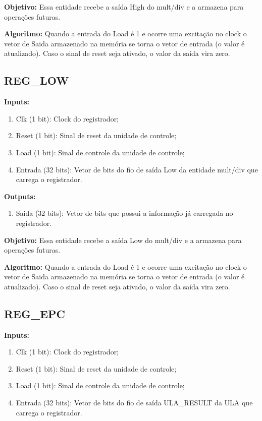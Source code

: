 \textbf{Objetivo:} Essa entidade recebe a saída High do mult/div e a armazena para operações futuras.

\textbf{Algoritmo:} Quando a entrada do Load é 1 e ocorre uma excitação no clock o vetor de Saida armazenado na memória se torna o vetor de entrada (o valor é atualizado). Caso o sinal de reset seja ativado, o valor da saída vira zero.



\subsection{REG\_LOW}

\textbf{Inputs:}

\begin{enumerate}
    \item Clk (1 bit): Clock do registrador;
    \item Reset (1 bit): Sinal de reset da unidade de controle;
    \item Load (1 bit): Sinal de controle da unidade de controle;
    \item Entrada (32 bits): Vetor de bits do fio de saída Low da entidade mult/div que carrega o registrador.
    
\end{enumerate}

\textbf{Outputs:}

\begin{enumerate}
    \item Saida (32 bits): Vetor de bits que possui a informação já carregada no registrador.
\end{enumerate}

\textbf{Objetivo:} Essa entidade recebe a saída Low do mult/div e a armazena para operações futuras.

\textbf{Algoritmo:} Quando a entrada do Load é 1 e ocorre uma excitação no clock o vetor de Saida armazenado na memória se torna o vetor de entrada (o valor é atualizado). Caso o sinal de reset seja ativado, o valor da saída vira zero.

\newpage

\subsection{REG\_EPC}

\textbf{Inputs:}

\begin{enumerate}
    \item Clk (1 bit): Clock do registrador;
    \item Reset (1 bit): Sinal de reset da unidade de controle;
    \item Load (1 bit): Sinal de controle da unidade de controle;
    \item Entrada (32 bits): Vetor de bits do fio de saída ULA\_RESULT da ULA que carrega o registrador.
    
\end{enumerate}

